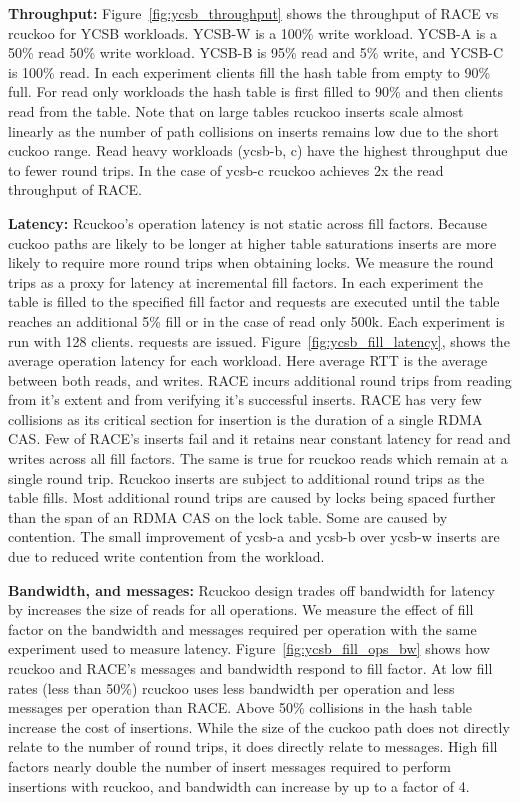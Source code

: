 \textbf{Throughput:} Figure~\ref{fig:ycsb_throughput} shows
the throughput of RACE vs rcuckoo for YCSB workloads. YCSB-W
is a 100\% write workload. YCSB-A is a 50\% read 50\% write
workload. YCSB-B is 95\% read and 5\% write, and YCSB-C is
100\% read.  In each experiment clients fill the hash table
from empty to 90\% full. For read only workloads the hash
table is first filled to 90\% and then clients read from the
table.  Note that on large tables rcuckoo inserts scale
almost linearly as the number of path collisions on inserts
remains low due to the short cuckoo range.  Read heavy
workloads (ycsb-b, c) have the highest throughput due to
fewer round trips. In the case of ycsb-c rcuckoo achieves 2x
the read throughput of RACE.

\textbf{Latency:} Rcuckoo's operation latency is not static
across fill factors. Because cuckoo paths are likely to be
longer at higher table saturations inserts are more likely
to require more round trips when obtaining locks. We measure
the round trips as a proxy for latency at incremental fill
factors. In each experiment the table is filled to the
specified fill factor and requests are executed until the
table reaches an additional 5\% fill or in the case of read
only 500k. Each experiment is run with 128 clients.
requests are issued. 
Figure~\ref{fig:ycsb_fill_latency}, shows the average
operation latency for each workload. Here average RTT is the
average between both reads, and writes. RACE incurs
additional round trips from reading from it's extent and
from verifying it's successful inserts. RACE has very few
collisions as its critical section for insertion is the
duration of a single RDMA CAS. Few of RACE's inserts fail
and it retains near constant latency for read and writes
across all fill factors. The same is true for rcuckoo reads
which remain at a single round trip. Rcuckoo inserts are
subject to additional round trips as the table fills.  Most
additional round trips are caused by locks being spaced
further than the span of an RDMA CAS on the lock table. Some
are caused by contention. The small improvement of ycsb-a
and ycsb-b over ycsb-w inserts are due to reduced write
contention from the workload.

\textbf{Bandwidth, and messages:} Rcuckoo design trades off
bandwidth for latency by increases the size of reads for all
operations. We measure the effect of fill factor on the
bandwidth and messages required per operation with the same
experiment used to measure latency.
Figure~\ref{fig:ycsb_fill_ops_bw} shows how rcuckoo and
RACE's messages and bandwidth respond to fill factor. At low
fill rates (less than 50\%) rcuckoo uses less bandwidth per
operation and less messages per operation than RACE. Above
50\% collisions in the hash table increase the cost of
insertions. While the size of the cuckoo path does not
directly relate to the number of round trips, it does
directly relate to messages. High fill factors nearly double
the number of insert messages required to perform insertions
with rcuckoo, and bandwidth can increase by up to a factor of
4. 

